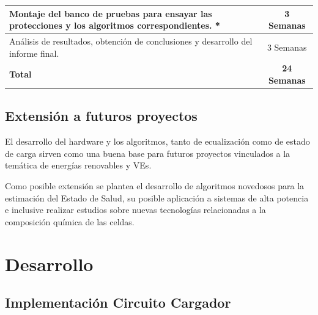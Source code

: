 \documentclass[10pt,a4paper]{article}
\begin{document}
\begin{table}[h!]
\begin{tabular}{|l|c|}
			Montaje del banco de pruebas para ensayar las protecciones y los algoritmos correspondientes. *                                                                                                                       & 3 Semanas                          \\ \hline
			Análisis de resultados, obtención de conclusiones y desarrollo del informe final.                                                                                                                                                       & 3 Semanas                          \\ \hline
			\textbf{Total}                                                                                                                                                                                                  &\textbf{24 Semanas} \\ \hline
		\end{tabular}
	\end{table}
	
	\subsection{Extensión a futuros proyectos}
	
	El desarrollo del hardware y los algoritmos, tanto de ecualización como de estado de carga sirven como una buena base para futuros proyectos vinculados a la temática de energías renovables y \acrshort{VE}s.
	
	Como posible extensión se plantea el desarrollo de algoritmos novedosos para la estimación del Estado de Salud, su posible aplicación a sistemas de alta potencia e inclusive realizar estudios sobre nuevas tecnologías relacionadas a la composición química de las celdas.

    \newpage

    \section{Desarrollo}\label{desarrollo}

    \subsection{Implementación Circuito Cargador}

\end{document}
